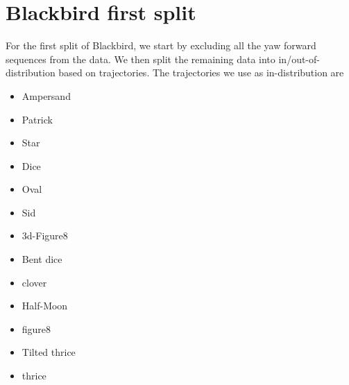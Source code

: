 \section{Blackbird first split}
\label{app:blkbrd_split}

For the first split of Blackbird, we start by excluding all the yaw forward sequences from the data. We then split the remaining data into in/out-of-distribution based on trajectories. The trajectories we use as in-distribution are
\begin{multicols}{2}
\begin{itemize}
    \item Ampersand 
    \item Patrick
    \item Star
    \item Dice
    \item Oval
    \item Sid
    \item 3d-Figure8
    \item Bent dice
    \item clover
    \item Half-Moon
    \item figure8
    \item Tilted thrice
    \item thrice
\end{itemize}{}
\end{multicols}
